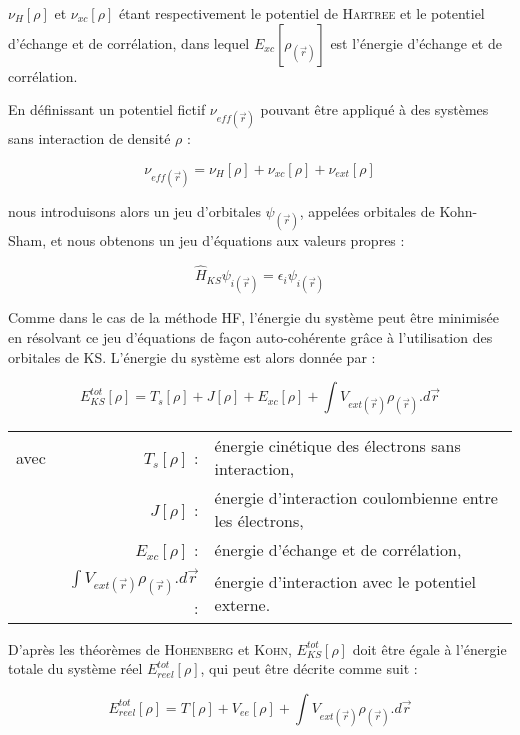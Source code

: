 \noindent $\nu_{H}[\rho]$ et $\nu_{xc}[\rho]$ étant respectivement le potentiel de \textsc{Hartree} et le potentiel d'échange et de corrélation, dans lequel $E_{xc}[\rho_{(\vec{r})}]$ est l'énergie d'échange et de corrélation.

En définissant un potentiel fictif $\nu_{eff(\vec{r})}$ pouvant être appliqué à des systèmes sans interaction de densité $\rho$ :

\begin{equation}
\nu_{eff(\vec{r})} = \nu_{H}[\rho] + \nu_{xc}[\rho] + \nu_{ext}[\rho]
\end{equation}

\noindent nous introduisons alors un jeu d'orbitales $\psi_{(\vec{r})}$, appelées orbitales de Kohn-Sham, et nous obtenons un jeu d'équations aux valeurs propres :

\begin{equation}
\hat{H}_{KS} \psi_{i(\vec{r})} = \epsilon_{i} \psi_{i(\vec{r})}
\end{equation}

Comme dans le cas de la méthode HF, l'énergie du système peut être minimisée en résolvant ce jeu d'équations de façon auto-cohérente grâce à l'utilisation des orbitales de KS. L'énergie du système est alors donnée par :

\begin{equation}
E_{KS}^{tot}[\rho] = T_{s}[\rho] + J[\rho] + E_{xc}[\rho] + \int V_{ext(\vec{r})}\rho_{(\vec{r})} .d\vec{r}
\end{equation}

\begin{flushleft}
\begin{tabular}{@{}lrp{10cm}}
avec & $T_{s}[\rho]$ : & énergie cinétique des électrons sans interaction, \\
& $J[\rho]$ : & énergie d'interaction coulombienne entre les électrons, \\
& $E_{xc}[\rho]$ : & énergie d'échange et de corrélation, \\
& $\int V_{ext(\vec{r})}\rho_{(\vec{r})} .d\vec{r}$ : & énergie d'interaction avec le potentiel externe. 
\end{tabular}
\end{flushleft}

D'après les théorèmes de \textsc{Hohenberg} et \textsc{Kohn}, $E_{KS}^{tot}[\rho]$ doit être égale à l'énergie totale du système réel $E_{reel}^{tot}[\rho]$, qui peut être décrite comme suit :

\begin{equation}
E_{reel}^{tot}[\rho] = T[\rho] + V_{ee}[\rho] + \int V_{ext(\vec{r})}\rho_{(\vec{r})} .d\vec{r}
\end{equation}

